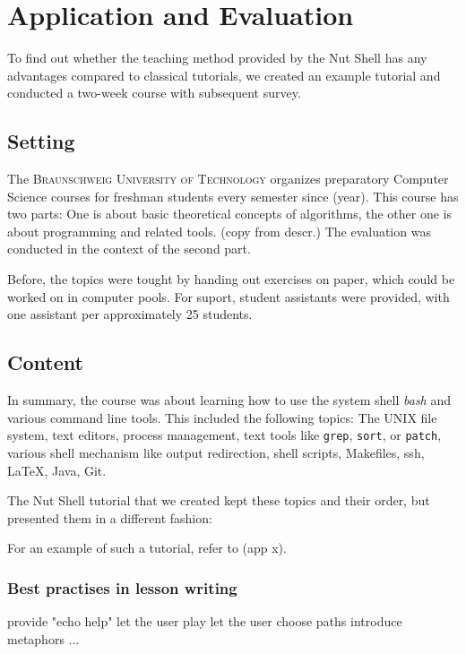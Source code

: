 \documentclass[a4paper,twoside,abstract=on,cleardoublepage=empty,numbers=noenddot,toc=bib]{scrreprt}
\begin{document}
\chapter{Application and Evaluation}

To find out whether the teaching method provided by the Nut Shell has any advantages compared to classical tutorials, we created an example tutorial and conducted a two-week course with subsequent survey.

\section{Setting}

The \textsc{Braunschweig University of Technology} organizes preparatory Computer Science courses for freshman students every semester since (year). This course has two parts: One is about basic theoretical concepts of algorithms, the other one is about programming and related tools. (copy from descr.) The evaluation was conducted in the context of the second part.

Before, the topics were tought by handing out exercises on paper, which could be worked on in computer pools. For suport, student assistants were provided, with one assistant per approximately 25 students.



\section{Content}

In summary, the course was about learning how to use the system shell \emph{bash} and various command line tools. This included the following topics: The UNIX file system, text editors, process management, text tools like \texttt{grep}, \texttt{sort}, or \texttt{patch}, various shell mechanism like output redirection, shell scripts, Makefiles, ssh, \LaTeX, Java, Git.

The Nut Shell tutorial that we created kept these topics and their order, but presented them in a different fashion: 

For an example of such a tutorial, refer to (app x).

\subsection{Best practises in lesson writing}

provide "echo help"
let the user play
let the user choose paths
introduce metaphors
...
\end{document}
